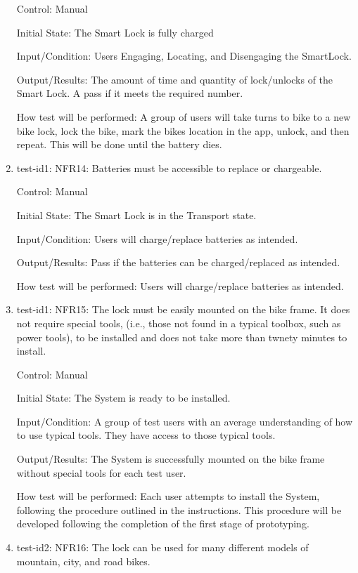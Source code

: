 \documentclass[12pt, titlepage]{article}
\begin{document}
\begin{enumerate}
Control: Manual 

Initial State: The Smart Lock is fully charged

Input/Condition: Users Engaging, Locating, and Disengaging the SmartLock.

Output/Results: The amount of time and quantity of lock/unlocks of the Smart Lock. A pass if it meets the required number.

How test will be performed:  A group of users will take turns to bike to a new bike lock, lock the bike, mark the bikes location in the app, unlock, and then repeat. This will be done until the battery dies.

\item{test-id1: NFR14: Batteries must be accessible to replace or chargeable. \\}

Control: Manual 

Initial State: The Smart Lock is in the Transport state.

Input/Condition: Users will charge/replace batteries as intended.

Output/Results: Pass if the batteries can be charged/replaced as intended.

How test will be performed: Users will charge/replace batteries as intended.

\item{test-id1: NFR15: The lock must be easily mounted on the bike frame. It does not require special tools, (i.e., those not found in a typical toolbox, such as power tools), to be installed and does not take more than twnety minutes to install.  \\}

Control: Manual 

Initial State: The System is ready to be installed.  

Input/Condition: A group of test users with an average understanding of how to use typical tools. They have access to those typical tools. 

Output/Results: The System is successfully mounted on the bike frame without special tools for each test user. 

How test will be performed: Each user attempts to install the System, following the procedure outlined in the instructions. This procedure will be developed following the completion of the first stage of prototyping. 

\item{test-id2: NFR16: The lock can be used for many different models of mountain, city, and road bikes.  \\}


\end{enumerate}
\end{document}
